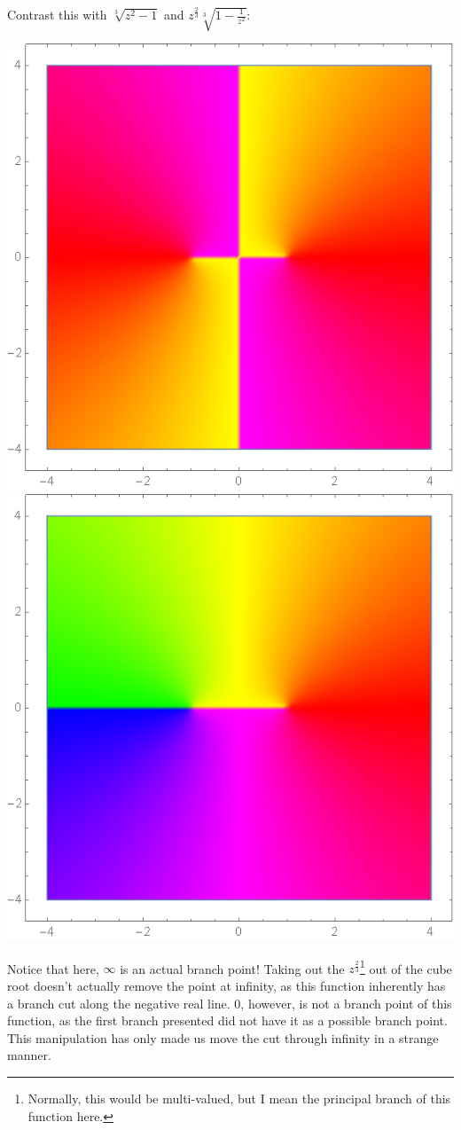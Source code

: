Contrast this with $\sqrt[3]{z^2-1}$ and $z^{\frac{2}{3}} \sqrt[3]{1-\frac{1}{z^2}}$:
\begin{center}
    \includegraphics[scale=0.27]{images/cbrtzsqrminus1.png}
    \includegraphics[scale=0.27]{images/cbrtzsqrminus2.png}
\end{center}
Notice that here, $\infty$ is an actual branch point! Taking out the $z^{\frac{2}{3}}$\footnote{Normally, this would be multi-valued, but I mean the principal branch of this function here. } out of the cube root doesn't actually remove the point at infinity, as this function inherently has a branch cut along the negative real line. $0$, however, is not a branch point of this function, as the first branch presented did not have it as a possible branch point. This manipulation has only made us move the cut through infinity in a strange manner.

